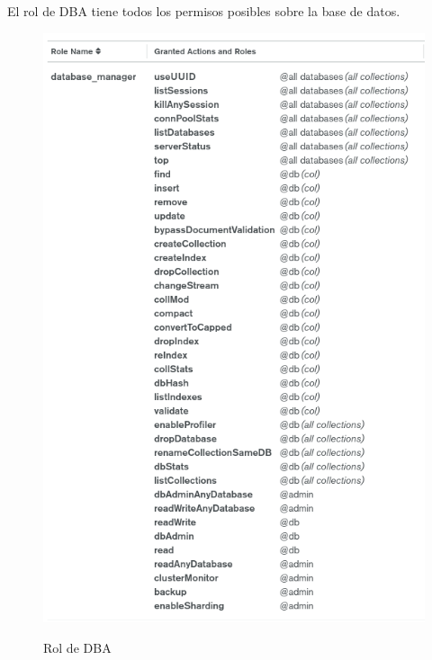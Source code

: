 \documentclass[10pt,a4paper]{article}
\begin{document}
El rol de DBA tiene todos los permisos posibles sobre la base de datos.
\begin{figure}[h!]
  \centering
  \includegraphics[scale=0.5]{dba.png}\\
  \caption{Rol de DBA}
  \label{fig:dba}
\end{figure}
\end{document}
